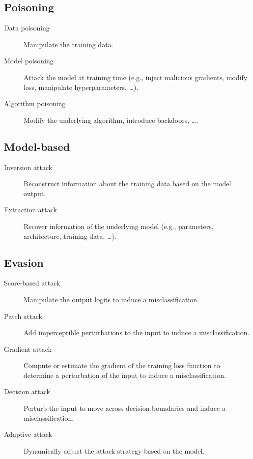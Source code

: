 \subsection{Poisoning}

\begin{description}
    \item[Data poisoning] 
        Manipulate the training data.

    \item[Model poisoning] 
        Attack the model at training time (e.g., inject malicious gradients, modify loss, manipulate hyperparameters, \dots).

    \item[Algorithm poisoning] 
        Modify the underlying algorithm, introduce backdoors, \dots.
\end{description}


\subsection{Model-based}

\begin{description}
    \item[Inversion attack] 
        Reconstruct information about the training data based on the model output.

    \item[Extraction attack] 
        Recover information of the underlying model (e.g., parameters, architecture, training data, \dots).
\end{description}


\subsection{Evasion}

\begin{description}
    \item[Score-based attack] 
        Manipulate the output logits to induce a misclassification.

    \item[Patch attack] 
        Add imperceptible perturbations to the input to induce a misclassification.

    \item[Gradient attack] 
        Compute or estimate the gradient of the training loss function to determine a perturbation of the input to induce a misclassification.

    \item[Decision attack] 
        Perturb the input to move across decision boundaries and induce a misclassification.

    \item[Adaptive attack] 
        Dynamically adjust the attack strategy based on the model.
\end{description}